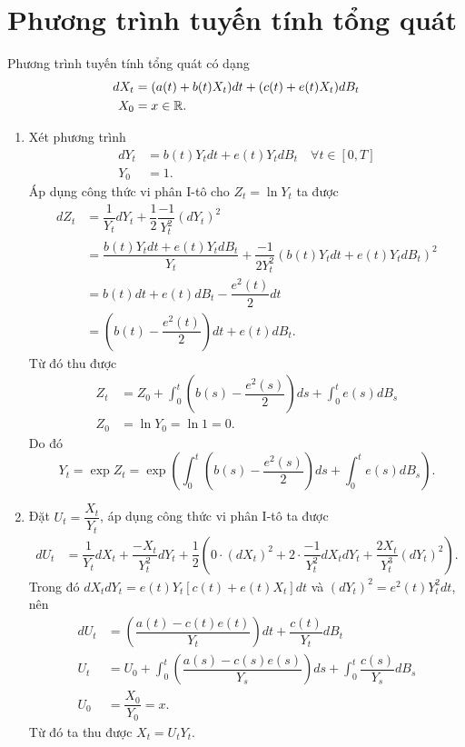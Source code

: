 \section{Phương trình tuyến tính tổng quát}
\begin{defn}
    Phương trình tuyến tính tổng quát có dạng
    \begin{align*}
        dX_t &= (a(t)+b(t)X_t)dt + (c(t)+e(t)X_t)dB_t\\
        X_0&= x \in \mathbb{R}.
    \end{align*}
\end{defn}
\begin{sol*}
    \begin{enumerate}
        \item Xét phương trình 
        \begin{align*}
            dY_t &= b(t)Y_tdt + e(t)Y_tdB_t \quad \forall t \in [0,T]\\
            Y_0 &= 1.
        \end{align*}
        Áp dụng công thức vi phân I-tô cho $Z_t = \ln{Y_t}$ ta được
        \begin{align*}
            dZ_t &= \dfrac{1}{Y_t}dY_t + \dfrac{1}{2}\dfrac{-1}{Y_t^2}(dY_t)^2\\
            &= \dfrac{b(t)Y_tdt + e(t)Y_tdB_t}{Y_t} + \dfrac{-1}{2Y_t^2}(b(t)Y_tdt + e(t)Y_tdB_t)^2\\
            &= b(t)dt + e(t)dB_t - \dfrac{e^2(t)}{2}dt\\
            &= \left(b(t)- \dfrac{e^2(t)}{2}\right)dt + e(t)dB_t.
        \end{align*}
        Từ đó thu được
        \begin{align*}
            Z_t &= Z_0 + \int_0^t{\left(b(s)- \dfrac{e^2(s)}{2}\right)ds} + \int_0^t{e(s)dB_s}  \\
            Z_0 &= \ln{Y_0} = \ln{1} = 0.
        \end{align*}
        Do đó \[Y_t = \exp{Z_t} = \exp\left(\int_0^t{\left(b(s)- \dfrac{e^2(s)}{2}\right)ds} + \int_0^t{e(s)dB_s}\right).\]
        \item Đặt $U_t = \dfrac{X_t}{Y_t}$, áp dụng công thức vi phân I-tô ta được
        \begin{align*}
            dU_t &= \dfrac{1}{Y_t}dX_t + \dfrac{-X_t}{Y_t^2}dY_t + \dfrac{1}{2}\left(0\cdot (dX_t)^2 + 2\cdot \dfrac{-1}{Y_t^2}dX_tdY_t + \dfrac{2X_t}{Y_t^3}(dY_t)^2\right).
        \end{align*}
        Trong đó $dX_tdY_t = e(t)Y_t[c(t)+e(t)X_t]dt$ và $(dY_t)^2 = e^2(t)Y_t^2dt$, nên
        \begin{align*}
            dU_t &= \left(\dfrac{a(t)-c(t)e(t)}{Y_t}\right)dt + \dfrac{c(t)}{Y_t}dB_t\\
            U_t  &= U_0 + \int_0^t \left(\dfrac{a(s)-c(s)e(s)}{Y_s}\right)ds + \int_0^t\dfrac{c(s)}{Y_s}dB_s\\
            U_0 &= \dfrac{X_0}{Y_0} = x.
        \end{align*}
        Từ đó ta thu được $X_t = U_tY_t$.
    \end{enumerate}
\end{sol*}
